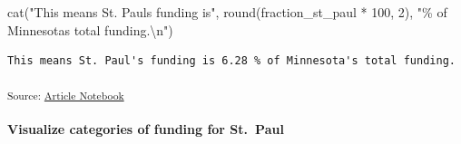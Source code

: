 \documentclass[
  letterpaper,
  DIV=11,
  numbers=noendperiod]{scrartcl}
\let\oldparagraph\paragraph
\renewcommand{\paragraph}[1]{\oldparagraph{#1}\mbox{}}
\newenvironment{Shaded}{\begin{snugshade}}{\end{snugshade}}
\newcommand{\DecValTok}[1]{\textcolor[rgb]{0.68,0.00,0.00}{#1}}
\newcommand{\FunctionTok}[1]{\textcolor[rgb]{0.28,0.35,0.67}{#1}}
\newcommand{\NormalTok}[1]{\textcolor[rgb]{0.00,0.23,0.31}{#1}}
\newcommand{\SpecialCharTok}[1]{\textcolor[rgb]{0.37,0.37,0.37}{#1}}
\newcommand{\StringTok}[1]{\textcolor[rgb]{0.13,0.47,0.30}{#1}}
\begin{document}
\begin{Shaded}
\begin{Highlighting}[]
\FunctionTok{cat}\NormalTok{(}\StringTok{"This means St. Paul\textquotesingle{}s funding is"}\NormalTok{, }\FunctionTok{round}\NormalTok{(fraction\_st\_paul }\SpecialCharTok{*} \DecValTok{100}\NormalTok{, }\DecValTok{2}\NormalTok{), }\StringTok{"\% of Minnesota\textquotesingle{}s total funding.}\SpecialCharTok{\textbackslash{}n}\StringTok{"}\NormalTok{)}
\end{Highlighting}
\end{Shaded}

\begin{verbatim}
This means St. Paul's funding is 6.28 % of Minnesota's total funding.
\end{verbatim}

\textsubscript{Source:
\href{https://beeckcenter.github.io/climate-equity-workforce/index-preview.html}{Article
Notebook}}

\paragraph{Visualize categories of funding for
St.~Paul}\label{visualize-categories-of-funding-for-st.-paul}
\end{document}
